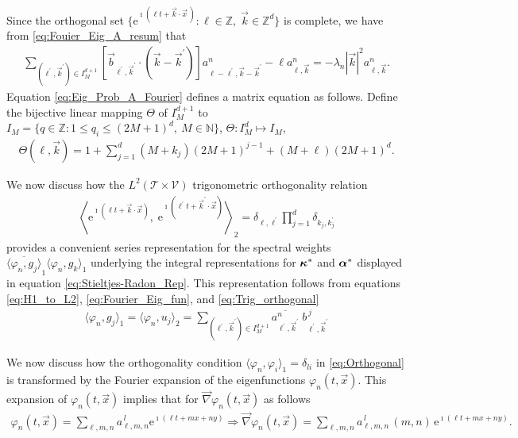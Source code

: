 \documentclass[11pt]{amsart}
\newcommand{\e}{\mathrm{e}}
\newcommand{\Tc}{\mathcal{T}}
\newcommand{\Vc}{\mathcal{V}}
\newcommand\balpha{\mbox{\boldmath${\alpha}$}}
\newcommand\bkappa{\mbox{\boldmath${\kappa}$}}
\begin{document}
%
Since the orthogonal set
$\{\e^{\imath(\ell t+\vec{k}\cdot\vec{x}\,)}:\ell\in\mathbb{Z},\;\vec{k}\in\mathbb{Z}^d\}$
is complete, we have \cite{Stone:64,Keener-2000} from
\eqref{eq:Fouier_Eig_A_resum} that
%
\begin{align}\label{eq:Eig_Prob_A_Fourier}
  \sum_{(\ell^\prime,\vec{k}^\prime)\in I_M^{d+1}}
  \left[\vec{b}_{\ell^\prime,\vec{k}^\prime}\cdot(\vec{k}-\vec{k}^\prime)
       \right]a^n_{\ell-\ell^\prime,\vec{k}-\vec{k}^\prime}
  -\ell a^n_{\ell,\vec{k}}
  =-\lambda_n|\vec{k}|^2a^n_{\ell,\vec{k}}.
\end{align}
%
Equation \eqref{eq:Eig_Prob_A_Fourier} defines a matrix equation as
follows. Define the bijective linear mapping $\Theta$ of $I_M^{d+1}$ to 
$I_M=\{q\in\mathbb{Z}:1\leq q_i\leq(2M+1)^d, \ M\in\mathbb{N}\}$,
$\Theta:I^d_M\mapsto I_M$,  
\begin{align}
  \Theta(\ell,\vec{k})=1+\sum_{j=1}^{d}(M+k_j)(2M+1)^{j-1}+(M+\ell)(2M+1)^d.
\end{align}
%


We now discuss how the $L^2(\Tc\times\Vc)$ trigonometric orthogonality
relation   
%
\begin{align}\label{eq:Trig_orthogonal}  
      \left\langle
      \e^{\imath (\ell t+\vec{k}\cdot\vec{x})},\;\e^{\imath (\ell^\prime t+\vec{k}^\prime\cdot\vec{x})}
      \right\rangle_2
      =\delta_{\ell,\ell^\prime}\prod_{j=1}^d\delta_{k_j,k_j^\prime}
\end{align}
%
provides a convenient series representation for the spectral weights 
$\overline{\langle\varphi_n,g_j\rangle}_1\langle\varphi_n,g_k\rangle_1$ underlying the integral
representations for $\bkappa^*$ and $\balpha^*$ displayed in equation
\eqref{eq:Stieltjes-Radon_Rep}. This representation follows from
equations \eqref{eq:H1_to_L2}, \eqref{eq:Fourier_Eig_fun}, and
\eqref{eq:Trig_orthogonal}
%
\begin{align}
  \langle\varphi_n,g_j\rangle_1=\langle\varphi_n,u_j\rangle_2=\sum_{(\ell^\prime,\vec{k}^\prime)\in I_M^{d+1}}
   \overline{a^n_{\ell^\prime,\vec{k}^\prime}}\;b^{\,j}_{\ell^\prime,\vec{k}^\prime}
\end{align}
%



We now discuss how the orthogonality condition
$\langle\varphi_n,\varphi_i\rangle_1=\delta_{li}$ in \eqref{eq:Orthogonal} is
transformed by the Fourier expansion of the
eigenfunctions $\varphi_n(t,\vec{x})$. This expansion of $\varphi_n(t,\vec{x})$ 
implies that for $\vec{\nabla}\varphi_n(t,\vec{x})$ as follows 
%
\begin{align}\label{eq:Eigenfunction_Grad_expansion}
  \varphi_n(t,\vec{x})=\sum_{\ell,m,n}a^{\,l}_{\ell,m,n}\e^{\imath (\ell t+mx+ny)}\Rightarrow
  \vec{\nabla}\varphi_n(t,\vec{x})=\sum_{\ell,m,n}a^{\,l}_{\ell,m,n}\,(m,n)\,\e^{\imath (\ell t+mx+ny)}.
\end{align}
%
\end{document}
